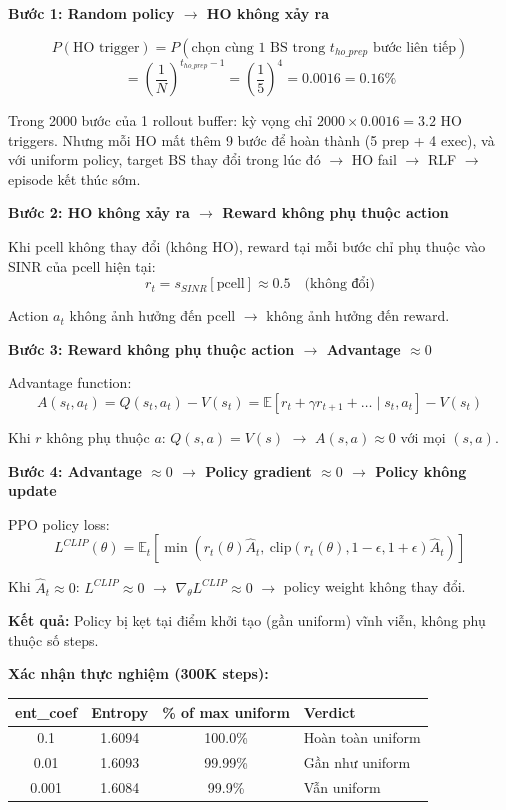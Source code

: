 \documentclass[11pt]{article}
\begin{document}
\textbf{Bước 1: Random policy $\to$ HO không xảy ra}

\[
P(\text{HO trigger}) = P(\text{chọn cùng 1 BS trong } t_{ho\_prep} \text{ bước liên tiếp})
\]
\[
= \left(\frac{1}{N}\right)^{t_{ho\_prep} - 1} = \left(\frac{1}{5}\right)^4 = 0.0016 = 0.16\%
\]

Trong 2000 bước của 1 rollout buffer: kỳ vọng chỉ $2000 \times 0.0016 = 3.2$ HO triggers. Nhưng mỗi HO mất thêm 9 bước để hoàn thành (5 prep + 4 exec), và với uniform policy, target BS thay đổi trong lúc đó $\to$ HO fail $\to$ RLF $\to$ episode kết thúc sớm.

\textbf{Bước 2: HO không xảy ra $\to$ Reward không phụ thuộc action}

Khi pcell không thay đổi (không HO), reward tại mỗi bước chỉ phụ thuộc vào SINR của pcell hiện tại:
\[
r_t = s_{SINR}[\text{pcell}] \approx 0.5 \quad \text{(không đổi)}
\]

Action $a_t$ không ảnh hưởng đến pcell $\to$ không ảnh hưởng đến reward.

\textbf{Bước 3: Reward không phụ thuộc action $\to$ Advantage $\approx 0$}

Advantage function:
\[
A(s_t, a_t) = Q(s_t, a_t) - V(s_t) = \mathbb{E}[r_t + \gamma r_{t+1} + \ldots \mid s_t, a_t] - V(s_t)
\]

Khi $r$ không phụ thuộc $a$: $Q(s, a) = V(s)$ $\to$ $A(s, a) \approx 0$ với mọi $(s, a)$.

\textbf{Bước 4: Advantage $\approx 0$ $\to$ Policy gradient $\approx 0$ $\to$ Policy không update}

PPO policy loss:
\[
L^{CLIP}(\theta) = \mathbb{E}_t \left[ \min\left( r_t(\theta) \hat{A}_t,\ \text{clip}(r_t(\theta), 1-\epsilon, 1+\epsilon) \hat{A}_t \right) \right]
\]

Khi $\hat{A}_t \approx 0$: $L^{CLIP} \approx 0$ $\to$ $\nabla_\theta L^{CLIP} \approx 0$ $\to$ policy weight không thay đổi.

\textbf{Kết quả:} Policy bị kẹt tại điểm khởi tạo (gần uniform) vĩnh viễn, không phụ thuộc số steps.

\textbf{Xác nhận thực nghiệm (300K steps):}

\begin{longtable}{@{}cccl@{}}
\toprule
\textbf{ent\_coef} & \textbf{Entropy} & \textbf{\% of max uniform} & \textbf{Verdict} \\
\midrule
\endhead
0.1 & 1.6094 & 100.0\% & Hoàn toàn uniform \\
0.01 & 1.6093 & 99.99\% & Gần như uniform \\
0.001 & 1.6084 & 99.9\% & Vẫn uniform \\
\bottomrule
\end{longtable}
\end{document}
